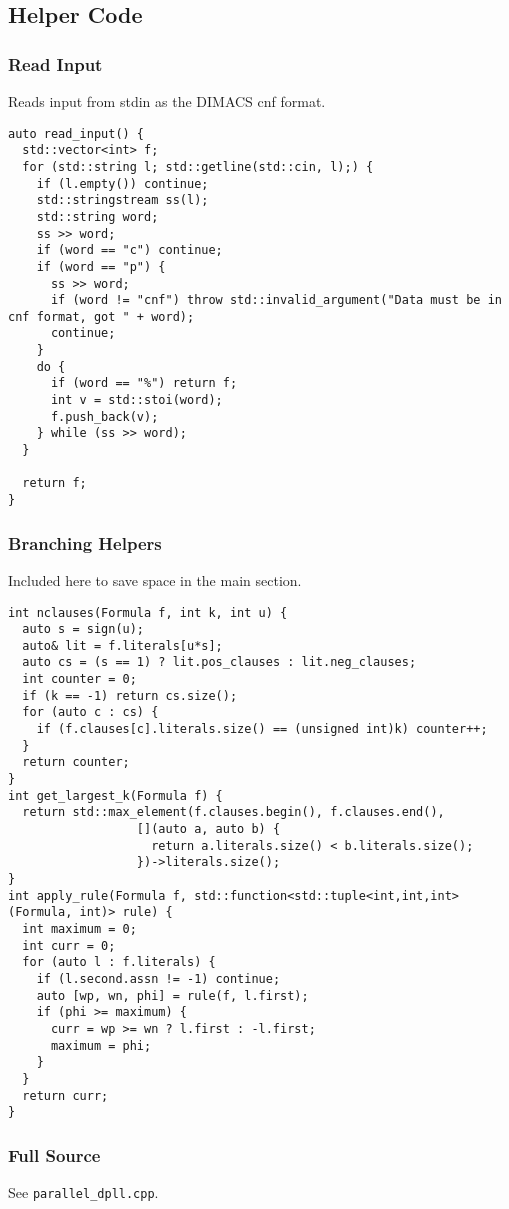 \documentclass[10pt,AMS Euler]{article}
\begin{document}
\subsection{Helper Code}
\label{sec:org66b988a}
\subsubsection{Read Input}
\label{sec:orgd9bd649}
Reads input from stdin as the DIMACS cnf format.
\begin{verbatim}
auto read_input() {
  std::vector<int> f;
  for (std::string l; std::getline(std::cin, l);) {
    if (l.empty()) continue;
    std::stringstream ss(l);
    std::string word;
    ss >> word;
    if (word == "c") continue;
    if (word == "p") {
      ss >> word;
      if (word != "cnf") throw std::invalid_argument("Data must be in cnf format, got " + word);
      continue;
    }
    do {
      if (word == "%") return f;
      int v = std::stoi(word);
      f.push_back(v);
    } while (ss >> word);
  }
  
  return f;
}
\end{verbatim}
\subsubsection{Branching Helpers}
\label{sec:org358dc03}
Included here to save space in the main section.
\begin{verbatim}
int nclauses(Formula f, int k, int u) {
  auto s = sign(u);
  auto& lit = f.literals[u*s];
  auto cs = (s == 1) ? lit.pos_clauses : lit.neg_clauses;
  int counter = 0;
  if (k == -1) return cs.size();
  for (auto c : cs) {
    if (f.clauses[c].literals.size() == (unsigned int)k) counter++;
  }
  return counter;
}
int get_largest_k(Formula f) {
  return std::max_element(f.clauses.begin(), f.clauses.end(),
                  [](auto a, auto b) {
                    return a.literals.size() < b.literals.size();
                  })->literals.size();
}
int apply_rule(Formula f, std::function<std::tuple<int,int,int>(Formula, int)> rule) {
  int maximum = 0;
  int curr = 0;
  for (auto l : f.literals) {
    if (l.second.assn != -1) continue;
    auto [wp, wn, phi] = rule(f, l.first);
    if (phi >= maximum) {
      curr = wp >= wn ? l.first : -l.first;
      maximum = phi;
    }
  }
  return curr;
}
\end{verbatim}
\subsubsection{Full Source}
\label{sec:org690f22f}
See \texttt{parallel\_dpll.cpp}.


\end{document}
